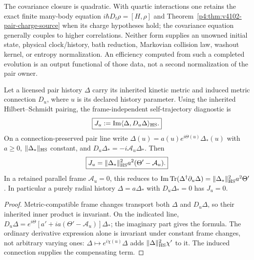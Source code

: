 \documentclass[12pt,a4paper]{article}
\begin{document}
\begin{remark}
\label{p4:rem:v4102-charge-propagation-scope}
The covariance closure is quadratic.  With quartic interactions one retains
the exact finite many-body equation $i\hbar D_t\rho=[H,\rho]$ and
Theorem~\ref{p4:thm:v4102-pair-charge-source} when its charge hypotheses hold;
the covariance equation generally couples to higher correlations.  Neither
form supplies an unowned initial state, physical clock/history, bath
reduction, Markovian collision law, washout kernel, or entropy normalization.
An efficiency computed from such a completed evolution is an output
functional of those data, not a second normalization of the pair owner.
\end{remark}

\begin{corollary}
\label{p4:cor:v498-phase-locked-pairing-invariant}
Let a licensed pair history $\Delta$ carry its inherited kinetic metric and
induced metric connection $D_u$, where $u$ is its declared history parameter.
Using the inherited Hilbert--Schmidt pairing, the frame-independent
self-trajectory diagnostic is
\begin{equation}
\label{p4:eq:v4102-covariant-pair-diagnostic}
 \boxed{J_u:=\operatorname{Im}
 \langle\Delta,D_u\Delta\rangle_{\rm HS}.}
\end{equation}
On a connection-preserved pair line write
$\Delta(u)=a(u)e^{i\Theta(u)}\Delta_*(u)$ with $a\ge0$,
$\|\Delta_*\|_{\rm HS}$ constant, and
$D_u\Delta_*=-i\mathcal A_u\Delta_*$.  Then
\begin{equation}
\label{p4:eq:v4102-relative-pair-phase}
 \boxed{J_u=\|\Delta_*\|_{\rm HS}^2a^2
             (\Theta'-\mathcal A_u).}
\end{equation}
In a retained parallel frame $\mathcal A_u=0$, this reduces to
$\operatorname{Im}\operatorname{Tr}(\Delta^\dagger\partial_u\Delta)
=\|\Delta_*\|_{\rm HS}^2a^2\Theta'$.
In particular a purely radial history $\Delta=a\Delta_*$ with
$D_u\Delta_*=0$ has $J_u=0$.
\end{corollary}

\begin{proof}
Metric-compatible frame changes transport both $\Delta$ and $D_u\Delta$,
so their inherited inner product is invariant.  On the indicated line,
$D_u\Delta=e^{i\Theta}[a'+ia(\Theta'-\mathcal A_u)]\Delta_*$;
the imaginary part gives the formula.  The ordinary derivative expression
alone is invariant under constant frame changes, not arbitrary varying
ones: $\Delta\mapsto e^{i\chi(u)}\Delta$ adds
$\|\Delta\|_{\rm HS}^2\chi'$ to it.  The induced connection supplies the
compensating term.
\end{proof}
\end{document}
